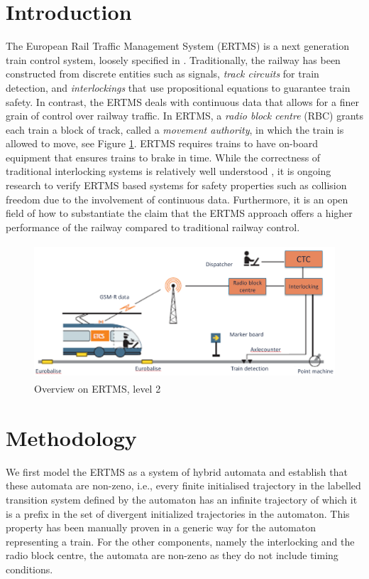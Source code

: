 \documentclass[runningheads,a4paper]{llncs}
\begin{document}
\section{Introduction}
The European Rail Traffic Management System (ERTMS) is a next
generation train control system, loosely specified in
\cite{SRS}. Traditionally, the railway has been constructed from
discrete entities such as signals, \emph{track circuits} for train
detection, and \emph{interlockings} that use propositional equations
to guarantee train safety. In contrast, the ERTMS deals with
continuous data that allows for a finer grain of control over
railway traffic. In ERTMS, a \emph{radio block centre} (RBC) grants each
train a block of track, called a \emph{movement authority}, in which
the train is allowed to move, see Figure \ref{fig:ertms}. ERTMS requires trains to have
on-board equipment that ensures trains to brake in time. While the
correctness of traditional interlocking systems is relatively well
understood \cite{Interlockings}, it is ongoing research to
verify ERTMS based systems for safety properties such as collision freedom due to
the involvement of continuous data. Furthermore, it is an open field of
how to substantiate the claim that the ERTMS approach offers a higher
performance of the railway compared to traditional railway control.
\begin{figure}
\centering
\includegraphics[height=5cm]{etcs}
\caption{Overview on ERTMS, level 2}
\label{fig:ertms}
\end{figure}





\section{Methodology}
We first model the ERTMS as a system of hybrid automata and establish
that these automata are non-zeno, i.e., every finite initialised
trajectory in the labelled transition system defined by the automaton
has an infinite trajectory of which it is a prefix in the set of
divergent initialized trajectories in the automaton. This property has
been manually proven in a generic way for the automaton representing a
train. For the other components, namely the interlocking and the radio
block centre, the automata are non-zeno as they do not include timing
conditions.
\end{document}

